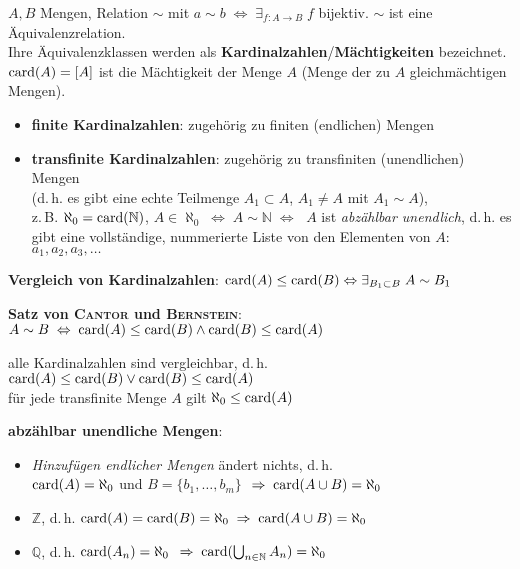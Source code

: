 $A, B$ Mengen, Relation $\sim$ mit
$a \sim b \;\Leftrightarrow\; \exists_{f: A \rightarrow B}\; f$ bijektiv.
$\sim$ ist eine Äquivalenzrelation. \\
Ihre Äquivalenzklassen werden als
\textbf{Kardinalzahlen}/\textbf{Mächtigkeiten} bezeichnet. \\
$\operatorname{card}(A) = [A]$ ist die Mächtigkeit der Menge $A$ (Menge der zu
$A$ gleichmächtigen Mengen).

\begin{itemize}
    \item \textbf{finite Kardinalzahlen}: zugehörig zu finiten (endlichen)
    Mengen

    \item \textbf{transfinite Kardinalzahlen}: zugehörig zu transfiniten
    (unendlichen) Mengen \\
    (d.\,h. es gibt eine echte Teilmenge $A_1 \subset A$, $A_1 \not= A$
    mit $A_1 \sim A$), \\
    z.\,B. $\aleph_0 = \operatorname{card}(\mathbb{N})$,
    $A \in \aleph_0 \;\Leftrightarrow\; A \sim \mathbb{N} \;\Leftrightarrow\;$
    $A$ ist \emph{abzählbar unendlich}, d.\,h. es gibt eine vollständige,
    nummerierte Liste von den Elementen von $A$: $a_1, a_2, a_3, \ldots$
\end{itemize}

\textbf{Vergleich von Kardinalzahlen}:
$\operatorname{card}(A) \le \operatorname{card}(B) \Leftrightarrow
\exists_{B_1 \subset B}\; A \sim B_1$

\textbf{Satz von \textsc{Cantor} und \textsc{Bernstein}}:
$A \sim B \;\Leftrightarrow\; \operatorname{card}(A) \le \operatorname{card}(B)
\land \operatorname{card}(B) \le \operatorname{card}(A)$

alle Kardinalzahlen sind vergleichbar, d.\,h.
$\operatorname{card}(A) \le \operatorname{card}(B)
\lor \operatorname{card}(B) \le \operatorname{card}(A)$ \\
für jede transfinite Menge $A$ gilt $\aleph_0 \le \operatorname{card}(A)$

\textbf{abzählbar unendliche Mengen}:

\begin{itemize}
    \item \emph{Hinzufügen endlicher Mengen} ändert nichts, d.\,h. \\
    $\operatorname{card}(A) = \aleph_0$ und $B = \{b_1, \ldots, b_m\}$
    $\;\Rightarrow\; \operatorname{card}(A \cup B) = \aleph_0$

    \item $\mathbb{Z}$, d.\,h.
    $\operatorname{card}(A) = \operatorname{card}(B) = \aleph_0 \;\Rightarrow\; \operatorname{card}(A \cup B) = \aleph_0$

    \item $\mathbb{Q}$, d.\,h. $\operatorname{card}(A_n) = \aleph_0$
    $\;\Rightarrow\; \operatorname{card}(\bigcup_{n \in \mathbb{N}} A_n) = \aleph_0$
\end{itemize}

